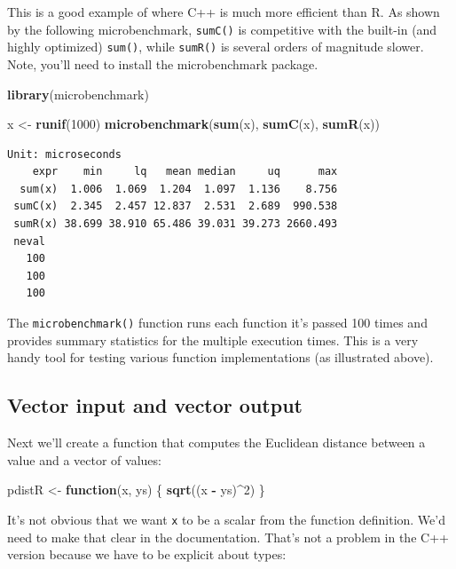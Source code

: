 \documentclass[]{krantz}
\makeatletter
\newenvironment{Shaded}{\begin{snugshade}}{\end{snugshade}}
\newcommand{\KeywordTok}[1]{\textcolor[rgb]{0.27,0.27,0.27}{\textbf{#1}}}
\newcommand{\DecValTok}[1]{\textcolor[rgb]{0.06,0.06,0.06}{#1}}
\newcommand{\StringTok}[1]{\textcolor[rgb]{0.5,0.5,0.5}{#1}}
\newcommand{\ControlFlowTok}[1]{\textcolor[rgb]{0.27,0.27,0.27}{\textbf{#1}}}
\newcommand{\OperatorTok}[1]{\textcolor[rgb]{0.43,0.43,0.43}{\textbf{#1}}}
\newcommand{\NormalTok}[1]{#1}
\newenvironment{kframe}{%
\medskip{}
\setlength{\fboxsep}{.8em}
 \def\at@end@of@kframe{}%
 \ifinner\ifhmode%
  \def\at@end@of@kframe{\end{minipage}}%
  \begin{minipage}{\columnwidth}%
 \fi\fi%
 \def\FrameCommand##1{\hskip\@totalleftmargin \hskip-\fboxsep
 \colorbox{shadecolor}{##1}\hskip-\fboxsep
     \hskip-\linewidth \hskip-\@totalleftmargin \hskip\columnwidth}%
 \MakeFramed {\advance\hsize-\width
   \@totalleftmargin\z@ \linewidth\hsize
   \@setminipage}}%
 {\par\unskip\endMakeFramed%
 \at@end@of@kframe}
\renewenvironment{Shaded}{\begin{kframe}}{\end{kframe}}
\makeatother
\begin{document}
This is a good example of where C++ is much more efficient than R. As
shown by the following microbenchmark, \texttt{sumC()} is competitive
with the built-in (and highly optimized) \texttt{sum()}, while
\texttt{sumR()} is several orders of magnitude slower. Note, you'll need
to install the microbenchmark package.

\begin{Shaded}
\begin{Highlighting}[]
\KeywordTok{library}\NormalTok{(microbenchmark)}

\NormalTok{x <-}\StringTok{ }\KeywordTok{runif}\NormalTok{(}\DecValTok{1000}\NormalTok{)}
\KeywordTok{microbenchmark}\NormalTok{(}\KeywordTok{sum}\NormalTok{(x), }\KeywordTok{sumC}\NormalTok{(x), }\KeywordTok{sumR}\NormalTok{(x))}
\end{Highlighting}
\end{Shaded}

\begin{verbatim}
Unit: microseconds
    expr    min     lq   mean median     uq      max
  sum(x)  1.006  1.069  1.204  1.097  1.136    8.756
 sumC(x)  2.345  2.457 12.837  2.531  2.689  990.538
 sumR(x) 38.699 38.910 65.486 39.031 39.273 2660.493
 neval
   100
   100
   100
\end{verbatim}

The \texttt{microbenchmark()} function runs each function it's passed
100 times and provides summary statistics for the multiple execution
times. This is a very handy tool for testing various function
implementations (as illustrated above).

\subsection{Vector input and vector
output}\label{vector-input-and-vector-output}

Next we'll create a function that computes the Euclidean distance
between a value and a vector of values:

\begin{Shaded}
\begin{Highlighting}[]
\NormalTok{pdistR <-}\StringTok{ }\ControlFlowTok{function}\NormalTok{(x, ys) \{}
    \KeywordTok{sqrt}\NormalTok{((x }\OperatorTok{-}\StringTok{ }\NormalTok{ys)}\OperatorTok{^}\DecValTok{2}\NormalTok{)}
\NormalTok{\}}
\end{Highlighting}
\end{Shaded}

It's not obvious that we want \texttt{x} to be a scalar from the
function definition. We'd need to make that clear in the documentation.
That's not a problem in the C++ version because we have to be explicit
about types:
\end{document}
